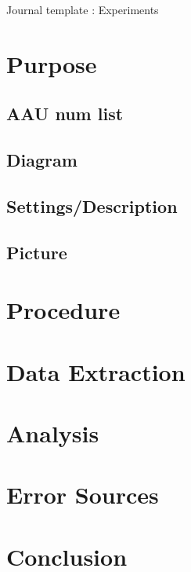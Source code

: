 \documentclass[12pt,a4paper]{article}
\begin{document}
\begin{Huge}
\begin{center}
Journal template : Experiments
\end{center}
\end{Huge}


\vspace{1cm}
\section{Purpose}
\subsection{AAU num list}
\subsection{Diagram}
\subsection{Settings/Description}
\subsection{Picture}
\vspace{1cm}
\section{Procedure}
\vspace{1cm}
\section{Data Extraction}
\vspace{1cm}
\section{Analysis}
\vspace{1cm}
\section{Error Sources}
\vspace{1cm}
\section{Conclusion}
\end{document}
